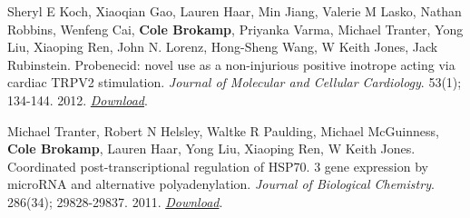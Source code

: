 Sheryl E Koch, Xiaoqian Gao, Lauren Haar, Min Jiang, Valerie M Lasko,
Nathan Robbins, Wenfeng Cai, \textbf{Cole Brokamp}, Priyanka Varma,
Michael Tranter, Yong Liu, Xiaoping Ren, John N. Lorenz, Hong-Sheng
Wang, W Keith Jones, Jack Rubinstein. Probenecid: novel use as a
non-injurious positive inotrope acting via cardiac TRPV2 stimulation.
\emph{Journal of Molecular and Cellular Cardiology}. 53(1); 134-144.
2012.
\href{http://colebrokamp-website.s3.amazonaws.com/publications/Koch_JMolCellCardiol_2011.pdf}{\emph{Download}}.

Michael Tranter, Robert N Helsley, Waltke R Paulding, Michael
McGuinness, \textbf{Cole Brokamp}, Lauren Haar, Yong Liu, Xiaoping Ren,
W Keith Jones. Coordinated post-transcriptional regulation of HSP70. 3
gene expression by microRNA and alternative polyadenylation.
\emph{Journal of Biological Chemistry}. 286(34); 29828-29837. 2011.
\href{http://colebrokamp-website.s3.amazonaws.com/publications/Tranter_JBiolChem_2011.pdf}{\emph{Download}}.
